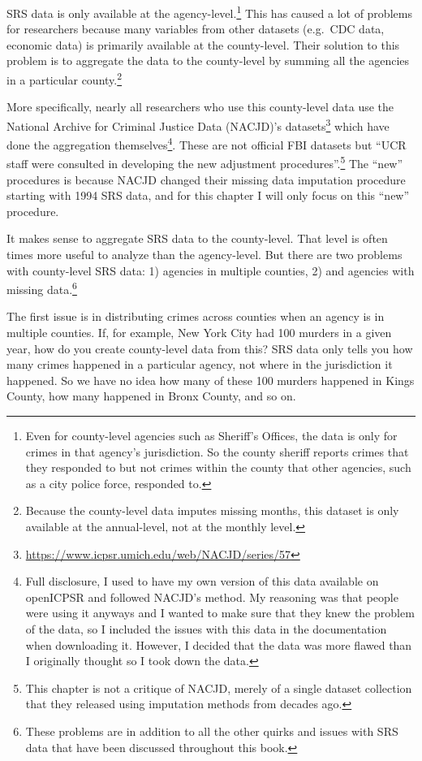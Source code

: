 \documentclass[
]{krantz}
\renewcommand{\href}[2]{#2\footnote{\url{#1}}}
\begin{document}
SRS data is only available at the agency-level.\footnote{Even
  for county-level agencies such as Sheriff's Offices, the
  data is only for crimes in that agency's jurisdiction. So
  the county sheriff reports crimes that they responded to
  but not crimes within the county that other agencies, such
  as a city police force, responded to.} This has caused a
lot of problems for researchers because many variables from
other datasets (e.g.~CDC data, economic data) is primarily
available at the county-level. Their solution to this
problem is to aggregate the data to the county-level by
summing all the agencies in a particular county.\footnote{Because
  the county-level data imputes missing months, this dataset
  is only available at the annual-level, not at the monthly
  level.}

More specifically, nearly all researchers who use this
county-level data use the National Archive for Criminal
Justice Data (NACJD)'s
\href{https://www.icpsr.umich.edu/web/NACJD/series/57}{datasets}
which have done the aggregation themselves\footnote{Full
  disclosure, I used to have my own version of this data
  available on openICPSR and followed NACJD's method. My
  reasoning was that people were using it anyways and I
  wanted to make sure that they knew the problem of the
  data, so I included the issues with this data in the
  documentation when downloading it. However, I decided that
  the data was more flawed than I originally thought so I
  took down the data.}. These are not official FBI datasets
but ``UCR staff were consulted in developing the new
adjustment procedures''.\footnote{This chapter is not a
  critique of NACJD, merely of a single dataset collection
  that they released using imputation methods from decades
  ago.} The ``new'' procedures is because NACJD changed
their missing data imputation procedure starting with 1994
SRS data, and for this chapter I will only focus on this
``new'' procedure.

It makes sense to aggregate SRS data to the county-level.
That level is often times more useful to analyze than the
agency-level. But there are two problems with county-level
SRS data: 1) agencies in multiple counties, 2) and agencies
with missing data.\footnote{These problems are in addition
  to all the other quirks and issues with SRS data that have
  been discussed throughout this book.}

The first issue is in distributing crimes across counties
when an agency is in multiple counties. If, for example, New
York City had 100 murders in a given year, how do you create
county-level data from this? SRS data only tells you how
many crimes happened in a particular agency, not where in
the jurisdiction it happened. So we have no idea how many of
these 100 murders happened in Kings County, how many
happened in Bronx County, and so on.
\end{document}
